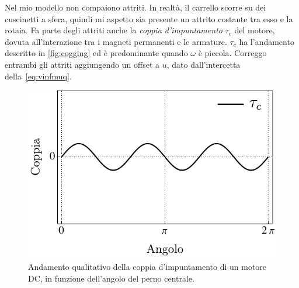 Nel mio modello non compaiono attriti.
In realtà, il carrello scorre su dei cuscinetti a sfera,
quindi mi aspetto sia presente un attrito costante tra esso e la rotaia.
Fa parte degli attriti anche la \emph{coppia d'impuntamento} $\tau_c$ del motore,
dovuta all'interazione tra i magneti permanenti e le armature. $\tau_c$ ha
l'andamento descritto in \autoref{fig:cogging} ed è predominante quando $\omega$ è
piccola.
Correggo entrambi gli attriti aggiungendo un offset a $u$, dato dall'intercetta
della~\eqref{eq:vinfmuq}.



\begin{figure}[H]
    \centering
    \includegraphics{assets/cogging-torque}
    \caption[Coppia d'impuntamento]{Andamento qualitativo della coppia d'impuntamento
    di un motore DC, in funzione dell'angolo del perno centrale.}
    \label{fig:cogging}
\end{figure}

